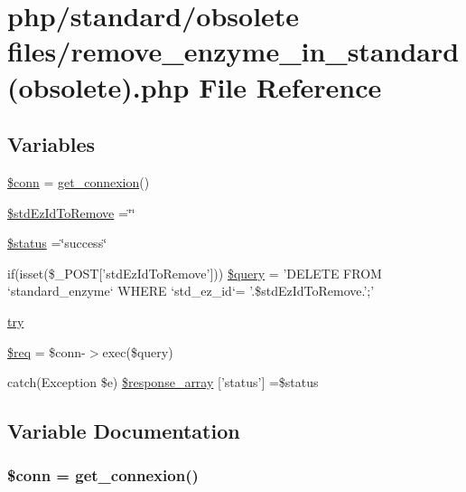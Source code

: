 \hypertarget{remove__enzyme__in__standard_07obsolete_08_8php}{\section{php/standard/obsolete files/remove\-\_\-enzyme\-\_\-in\-\_\-standard(obsolete).php File Reference}
\label{remove__enzyme__in__standard_07obsolete_08_8php}
}
\subsection*{Variables}
\begin{DoxyCompactItemize}
\item 
\hyperlink{remove__enzyme__in__standard_07obsolete_08_8php_aa8a5a87b9c1a6a0819b88447cbe41877}{\$conn} = \hyperlink{php__functions_8php_ace18bc10f3fd08f92688ac743e0d8c2e}{get\-\_\-connexion}()
\item 
\hyperlink{remove__enzyme__in__standard_07obsolete_08_8php_a82f60c379683413d3b4269adbe259606}{\$std\-Ez\-Id\-To\-Remove} =\char`\"{}\char`\"{}
\item 
\hyperlink{remove__enzyme__in__standard_07obsolete_08_8php_a58391ea75f2d29d5d708d7050b641c33}{\$status} =\char`\"{}success\char`\"{}
\item 
if(isset(\$\-\_\-\-P\-O\-S\-T\mbox{[}'std\-Ez\-Id\-To\-Remove'\mbox{]})) \hyperlink{remove__enzyme__in__standard_07obsolete_08_8php_a46a28a65a24f7a31388b22d12d2bb16a}{\$query} = 'D\-E\-L\-E\-T\-E F\-R\-O\-M `standard\-\_\-enzyme` W\-H\-E\-R\-E `std\-\_\-ez\-\_\-id`= '.\$std\-Ez\-Id\-To\-Remove.';'
\item 
\hyperlink{remove__enzyme__in__standard_07obsolete_08_8php_abe4cc9788f52e49485473dc699537388}{try}
\item 
\hyperlink{remove__enzyme__in__standard_07obsolete_08_8php_a63a7a283ea5dee8af1e2d5a3435bf370}{\$req} = \$conn-\/$>$exec(\$query)
\item 
catch(Exception \$e) \hyperlink{remove__enzyme__in__standard_07obsolete_08_8php_a8452fb8131316637a04e25f5fde066d9}{\$response\-\_\-array} \mbox{[}'status'\mbox{]} =\$status
\end{DoxyCompactItemize}


\subsection{Variable Documentation}
\hypertarget{remove__enzyme__in__standard_07obsolete_08_8php_aa8a5a87b9c1a6a0819b88447cbe41877}{
\subsubsection[{\$conn}]{\setlength{\rightskip}{0pt plus 5cm}\$conn = {\bf get\-\_\-connexion}()}}\label{remove__enzyme__in__standard_07obsolete_08_8php_aa8a5a87b9c1a6a0819b88447cbe41877}


